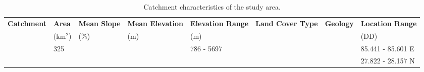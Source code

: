 \begin{itemize}
\begin{table}[h!]
\centering
\begin{small}
\begin{tabular}{p{2cm} p{1cm} p{1cm} p{1.8cm} p{1.8cm} p{2cm} p{1.5cm} p{2.8cm}}
\hline
\textbf{Catchment} & \textbf{Area} & \textbf{Mean Slope} & \textbf{\phantom{hi}Mean \phantom{hel} Elevation} & \textbf{\phantom{}Elevation \phantom{hi}Range} & \textbf{Land Cover \phantom{iee}Type} & \textbf{Geology} & \textbf{\phantom{hiidii}Location \phantom{oideo}Range} \\ 
                   & (km\(^2\))    & \phantom{h}(\%)                & \phantom{hdii}(m)                     & \phantom{hifi}(m)                      &                         &                   & \phantom{hiiiiiiiiii}(DD)             \\ \hline
                   &     \phantom{h}325          &                     &                         &    786 - 5697                     &                         &                   &      85.441 - 85.601 E                  \\
                   &               &                     &                         &                          &                         &                   &      27.822 - 28.157 N                 \\ \hline
\end{tabular}
\end{small}
\caption{Catchment characteristics of the study area.}
\label{tab:catchment_characteristics}
\end{table}



\end{itemize}